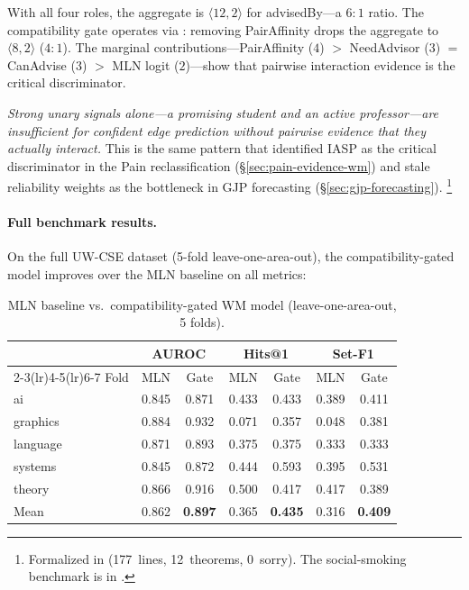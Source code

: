 \documentclass[11pt,openany]{report}
\begin{document}
\noindent
With all four roles, the aggregate is $\langle 12, 2 \rangle$
for advisedBy---a $6{:}1$ ratio.  The compatibility gate
operates via : removing PairAffinity drops the
aggregate to $\langle 8, 2 \rangle$ ($4{:}1$).  The marginal
contributions---PairAffinity ($4$) $>$ NeedAdvisor ($3$) $=$
CanAdvise ($3$) $>$ MLN logit ($2$)---show that pairwise
interaction evidence is the critical discriminator.

\emph{Strong unary signals alone---a promising student and an
active professor---are insufficient for confident edge prediction
without pairwise evidence that they actually interact.}  This is
the same  pattern that identified IASP as the
critical discriminator in the Pain reclassification
(\S\ref{sec:pain-evidence-wm}) and stale reliability weights as
the bottleneck in GJP forecasting
(\S\ref{sec:gjp-forecasting}).%
\footnote{Formalized in
(177~lines, 12~theorems, 0~sorry).  The social-smoking benchmark
is in .}

\paragraph{Full benchmark results.}
On the full UW-CSE dataset (5-fold leave-one-area-out), the
compatibility-gated model improves over the MLN baseline on all
metrics:

\begin{table}[htbp]
\centering
\caption{MLN baseline vs.\ compatibility-gated WM model
  (leave-one-area-out, 5 folds).}
\label{tab:uwcse-gate-results}
\footnotesize
\begin{tabular}{l cc cc cc}
\toprule
& \multicolumn{2}{c}{AUROC} & \multicolumn{2}{c}{Hits@1}
& \multicolumn{2}{c}{Set-F1} \\
\cmidrule(lr){2-3}\cmidrule(lr){4-5}\cmidrule(lr){6-7}
Fold & MLN & Gate & MLN & Gate & MLN & Gate \\
\midrule
ai       & 0.845 & 0.871 & 0.433 & 0.433 & 0.389 & 0.411 \\
graphics & 0.884 & 0.932 & 0.071 & 0.357 & 0.048 & 0.381 \\
language & 0.871 & 0.893 & 0.375 & 0.375 & 0.333 & 0.333 \\
systems  & 0.845 & 0.872 & 0.444 & 0.593 & 0.395 & 0.531 \\
theory   & 0.866 & 0.916 & 0.500 & 0.417 & 0.417 & 0.389 \\
\midrule
Mean & 0.862 & \textbf{0.897} & 0.365 & \textbf{0.435}
     & 0.316 & \textbf{0.409} \\
\bottomrule
\end{tabular}
\end{table}
\end{document}
